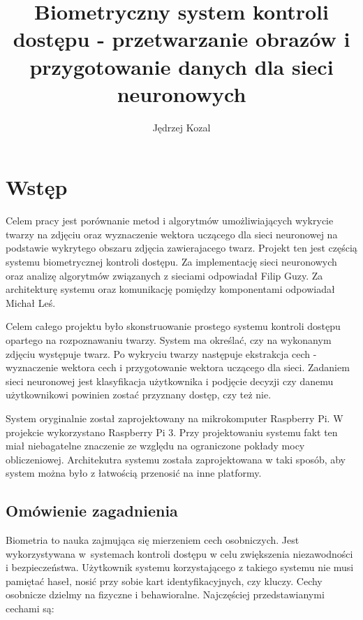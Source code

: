 \documentclass[oneside, eng]{mgr}
\title{Biometryczny system kontroli dostępu - przetwarzanie obrazów i przygotowanie danych dla sieci neuronowych}
\author{Jędrzej Kozal}
\begin{document}


\maketitle

\linespread{1.5}

\chapter{Wstęp}
Celem pracy jest porównanie metod i algorytmów umożliwiających wykrycie twarzy na zdjęciu oraz wyznaczenie wektora uczącego dla sieci neuronowej na podstawie wykrytego obszaru zdjęcia zawierajacego twarz. Projekt ten jest częścią systemu biometrycznej kontroli dostępu. Za implementację sieci neuronowych oraz analizę algorytmów związanych z sieciami odpowiadał Filip Guzy. Za architekturę systemu oraz komunikację pomiędzy komponentami odpowiadał Michał Leś. 

Celem całego projektu było skonstruowanie prostego systemu kontroli dostępu opartego na rozpoznawaniu twarzy. System ma określać, czy na wykonanym zdjęciu występuje twarz. Po wykryciu twarzy następuje ekstrakcja cech - wyznaczenie wektora cech i przygotowanie wektora uczącego dla sieci. Zadaniem sieci neuronowej jest klasyfikacja użytkownika i podjęcie decyzji czy danemu użytkownikowi powinien zostać przyznany dostęp, czy też nie.

System oryginalnie został zaprojektowany na mikrokomputer Raspberry Pi. W projekcie wykorzystano Raspberry Pi 3. Przy projektowaniu systemu fakt ten miał niebagatelne znaczenie ze względu na ograniczone pokłady mocy obliczeniowej. Architekutra systemu została zaprojektowana w taki sposób, aby system można było z łatwością przenosić na inne platformy. 


\section{Omówienie zagadnienia}

Biometria to nauka zajmująca się mierzeniem cech osobniczych. Jest wykorzystywana w~systemach kontroli dostępu w celu zwiększenia niezawodności i bezpieczeństwa. Użytkownik systemu korzystającego z takiego systemu nie musi pamiętać haseł, nosić przy sobie kart identyfikacyjnych, czy kluczy. Cechy osobnicze dzielmy na fizyczne i behawioralne. Najczęściej przedstawianymi cechami są:
\end{document}
